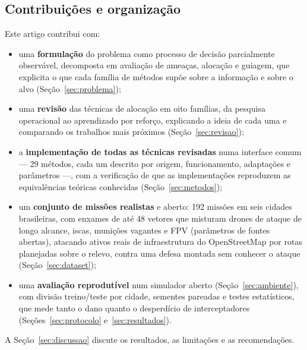 \subsection{Contribuições e organização}
Este artigo contribui com:
\begin{itemize}
  \item uma \textbf{formulação} do problema como processo de decisão parcialmente observável, decomposta em avaliação de
        ameaças, alocação e guiagem, que explicita o que cada família de métodos supõe sobre a informação e sobre o alvo
        (Seção~\ref{sec:problema});
  \item uma \textbf{revisão} das técnicas de alocação em oito famílias, da pesquisa operacional ao aprendizado por
        reforço, explicando a ideia de cada uma e comparando os trabalhos mais próximos (Seção~\ref{sec:revisao});
  \item a \textbf{implementação de todas as técnicas revisadas} numa interface comum --- 29 métodos, cada um descrito por
        origem, funcionamento, adaptações e parâmetros ---, com a verificação de que as implementações reproduzem as
        equivalências teóricas conhecidas (Seção~\ref{sec:metodos});
  \item um \textbf{conjunto de missões realistas} e aberto: 192 missões em seis cidades brasileiras, com enxames de até
        48 vetores que misturam drones de ataque de longo alcance, iscas, munições vagantes e FPV (parâmetros de fontes
        abertas), atacando ativos reais de infraestrutura do OpenStreetMap por rotas planejadas sobre o relevo, contra
        uma defesa montada sem conhecer o ataque (Seção~\ref{sec:dataset});
  \item uma \textbf{avaliação reprodutível} num simulador aberto (Seção~\ref{sec:ambiente}), com divisão treino/teste
        por cidade, sementes pareadas e testes estatísticos, que mede tanto o dano quanto o desperdício de
        interceptadores (Seções~\ref{sec:protocolo} e~\ref{sec:resultados}).
\end{itemize}
A Seção~\ref{sec:discussao} discute os resultados, as limitações e as recomendações.
